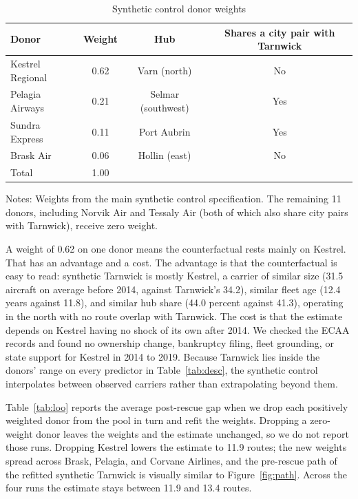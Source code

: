 \documentclass[12pt]{article}
\begin{document}
\begin{table}[ht]
\centering
\begin{threeparttable}
\caption{Synthetic control donor weights}
\label{tab:weights}
\begin{tabular}{lccc}
\toprule
Donor & Weight & Hub & Shares a city pair with Tarnwick \\
\midrule
Kestrel Regional & 0.62 & Varn (north) & No \\
Pelagia Airways & 0.21 & Selmar (southwest) & Yes \\
Sundra Express & 0.11 & Port Aubrin & Yes \\
Brask Air & 0.06 & Hollin (east) & No \\
\midrule
Total & 1.00 & & \\
\bottomrule
\end{tabular}
\begin{tablenotes}\footnotesize
\item Notes: Weights from the main synthetic control specification. The remaining 11 donors, including Norvik Air and Tessaly Air (both of which also share city pairs with Tarnwick), receive zero weight.
\end{tablenotes}
\end{threeparttable}
\end{table}

A weight of 0.62 on one donor means the counterfactual rests mainly on Kestrel. That has an advantage and a cost. The advantage is that the counterfactual is easy to read: synthetic Tarnwick is mostly Kestrel, a carrier of similar size (31.5 aircraft on average before 2014, against Tarnwick's 34.2), similar fleet age (12.4 years against 11.8), and similar hub share (44.0 percent against 41.3), operating in the north with no route overlap with Tarnwick. The cost is that the estimate depends on Kestrel having no shock of its own after 2014. We checked the ECAA records and found no ownership change, bankruptcy filing, fleet grounding, or state support for Kestrel in 2014 to 2019. Because Tarnwick lies inside the donors' range on every predictor in Table~\ref{tab:desc}, the synthetic control interpolates between observed carriers rather than extrapolating beyond them.

Table~\ref{tab:loo} reports the average post-rescue gap when we drop each positively weighted donor from the pool in turn and refit the weights. Dropping a zero-weight donor leaves the weights and the estimate unchanged, so we do not report those runs. Dropping Kestrel lowers the estimate to 11.9 routes; the new weights spread across Brask, Pelagia, and Corvane Airlines, and the pre-rescue path of the refitted synthetic Tarnwick is visually similar to Figure~\ref{fig:path}. Across the four runs the estimate stays between 11.9 and 13.4 routes.
\end{document}
